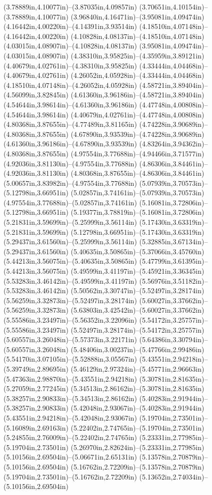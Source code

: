 (3.78889in,4.10077in)--(3.87035in,4.09857in) (3.70651in,4.10154in)--(3.78889in,4.10077in) (3.96840in,4.16471in)--(3.95081in,4.09474in) (4.16442in,4.00220in)--(4.14391in,3.93514in) (4.18510in,4.07148in)--(4.16442in,4.00220in) (4.10828in,4.08137in)--(4.18510in,4.07148in) (4.03015in,4.08907in)--(4.10828in,4.08137in) (3.95081in,4.09474in)--(4.03015in,4.08907in) (4.38310in,3.95825in)--(4.35959in,3.89121in) (4.40679in,4.02761in)--(4.38310in,3.95825in) (4.33444in,4.04468in)--(4.40679in,4.02761in) (4.26052in,4.05928in)--(4.33444in,4.04468in) (4.18510in,4.07148in)--(4.26052in,4.05928in) (4.58721in,3.89404in)--(4.56099in,3.82845in) (4.61360in,3.96186in)--(4.58721in,3.89404in) (4.54644in,3.98614in)--(4.61360in,3.96186in) (4.47748in,4.00808in)--(4.54644in,3.98614in) (4.40679in,4.02761in)--(4.47748in,4.00808in) (4.80368in,3.87655in)--(4.77489in,3.81165in) (4.74228in,3.90689in)--(4.80368in,3.87655in) (4.67890in,3.93539in)--(4.74228in,3.90689in) (4.61360in,3.96186in)--(4.67890in,3.93539in) (4.83264in,3.94362in)--(4.80368in,3.87655in) (4.97554in,3.77688in)--(4.94466in,3.71577in) (4.92036in,3.81130in)--(4.97554in,3.77688in) (4.86306in,3.84461in)--(4.92036in,3.81130in) (4.80368in,3.87655in)--(4.86306in,3.84461in) (5.00657in,3.83982in)--(4.97554in,3.77688in) (5.07939in,3.70573in)--(5.12798in,3.66951in) (5.02857in,3.74161in)--(5.07939in,3.70573in) (4.97554in,3.77688in)--(5.02857in,3.74161in) (5.16081in,3.72806in)--(5.12798in,3.66951in) (5.19377in,3.78819in)--(5.16081in,3.72806in) (5.21831in,3.59699in)--(5.25999in,3.56114in) (5.17430in,3.63319in)--(5.21831in,3.59699in) (5.12798in,3.66951in)--(5.17430in,3.63319in) (5.29437in,3.61560in)--(5.25999in,3.56114in) (5.32885in,3.67134in)--(5.29437in,3.61560in) (5.40635in,3.50865in)--(5.37066in,3.45760in) (5.44213in,3.56075in)--(5.40635in,3.50865in) (5.47799in,3.61395in)--(5.44213in,3.56075in) (5.49599in,3.41197in)--(5.45921in,3.36345in) (5.53283in,3.46142in)--(5.49599in,3.41197in) (5.56976in,3.51182in)--(5.53283in,3.46142in) (5.50562in,3.30747in)--(5.52497in,3.28174in) (5.56259in,3.32873in)--(5.52497in,3.28174in) (5.60027in,3.37662in)--(5.56259in,3.32873in) (5.63803in,3.42542in)--(5.60027in,3.37662in) (5.55586in,3.23497in)--(5.56352in,3.22096in) (5.54172in,3.25757in)--(5.55586in,3.23497in) (5.52497in,3.28174in)--(5.54172in,3.25757in) (5.60557in,3.26048in)--(5.57373in,3.22171in) (5.64386in,3.30794in)--(5.60557in,3.26048in) (5.48406in,3.00237in)--(5.47766in,2.99486in) (5.54170in,3.07105in)--(5.52888in,3.05567in) (5.43551in,2.94218in)--(5.39749in,2.89695in) (5.46129in,2.97324in)--(5.45771in,2.96663in) (5.47363in,2.98870in)--(5.43551in,2.94218in) (5.30781in,2.81635in)--(5.27059in,2.77245in) (5.34513in,2.86162in)--(5.30781in,2.81635in) (5.38257in,2.90833in)--(5.34513in,2.86162in) (5.40283in,2.91944in)--(5.38257in,2.90833in) (5.42048in,2.93067in)--(5.40283in,2.91944in) (5.43551in,2.94218in)--(5.42048in,2.93067in) (5.19704in,2.73501in)--(5.16089in,2.69163in) (5.22402in,2.74765in)--(5.19704in,2.73501in) (5.24855in,2.76009in)--(5.22402in,2.74765in) (5.23331in,2.77985in)--(5.19704in,2.73501in) (5.26970in,2.82624in)--(5.23331in,2.77985in) (5.10156in,2.69504in)--(5.06671in,2.65131in) (5.13578in,2.70879in)--(5.10156in,2.69504in) (5.16762in,2.72209in)--(5.13578in,2.70879in) (5.19704in,2.73501in)--(5.16762in,2.72209in) (5.13652in,2.74034in)--(5.10156in,2.69504in) 